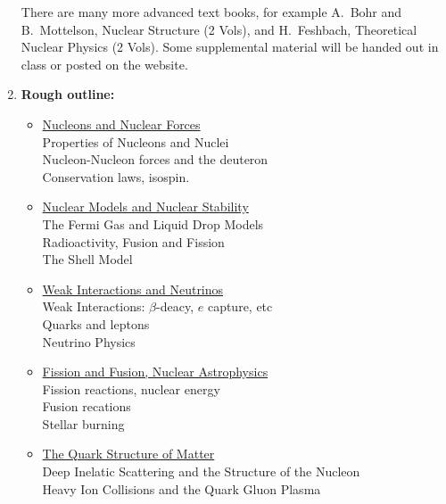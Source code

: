 \begin{enumerate}
{There are many more advanced text books, for example A.~Bohr
and B.~Mottelson, Nuclear Structure (2 Vols), and H.~Feshbach,
Theoretical Nuclear Physics (2 Vols). Some supplemental material 
will be handed out in class or posted on the website.}
 
\item{{\bf Rough outline:}
 \begin{itemize}
 \item{\underline{Nucleons and Nuclear Forces}\\
Properties of Nucleons and Nuclei\\
Nucleon-Nucleon forces and the deuteron\\
Conservation laws, isospin.}

\item{\underline{Nuclear Models and Nuclear Stability}\\
The Fermi Gas and Liquid Drop Models\\
Radioactivity, Fusion and Fission\\
The Shell Model}

\item{\underline{Weak Interactions and Neutrinos}\\
Weak Interactions: $\beta$-deacy, $e$ capture, etc\\
Quarks and leptons\\
Neutrino Physics}

\item{\underline{Fission and Fusion, Nuclear Astrophysics }\\
Fission reactions, nuclear energy\\
Fusion recations\\
Stellar burning}

\item{\underline{The Quark Structure of Matter}\\
Deep Inelatic Scattering and the Structure of the Nucleon\\
Heavy Ion Collisions and the Quark Gluon Plasma}



 \end{itemize}}
\end{enumerate}
   
 

 


  

